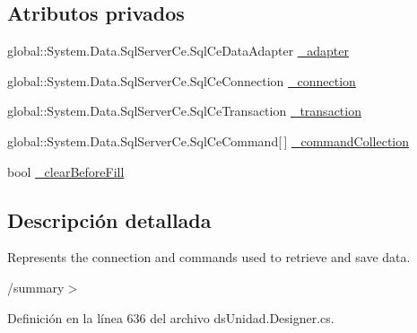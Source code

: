 \subsection*{Atributos privados}
\begin{DoxyCompactItemize}
\item 
global\-::\-System.\-Data.\-Sql\-Server\-Ce.\-Sql\-Ce\-Data\-Adapter \hyperlink{class_proyecto___integrador__3_1_1ds_unidad_table_adapters_1_1_unidad_table_adapter_ab399a596bea65cb98131fe8b2f74a979}{\-\_\-adapter}
\item 
global\-::\-System.\-Data.\-Sql\-Server\-Ce.\-Sql\-Ce\-Connection \hyperlink{class_proyecto___integrador__3_1_1ds_unidad_table_adapters_1_1_unidad_table_adapter_a1248a70b1ff6e674c43448a8a8afe9ab}{\-\_\-connection}
\item 
global\-::\-System.\-Data.\-Sql\-Server\-Ce.\-Sql\-Ce\-Transaction \hyperlink{class_proyecto___integrador__3_1_1ds_unidad_table_adapters_1_1_unidad_table_adapter_a902952d8f7e85197f0a9a3b00b0612ac}{\-\_\-transaction}
\item 
global\-::\-System.\-Data.\-Sql\-Server\-Ce.\-Sql\-Ce\-Command\mbox{[}$\,$\mbox{]} \hyperlink{class_proyecto___integrador__3_1_1ds_unidad_table_adapters_1_1_unidad_table_adapter_af19313099dd39bcd72211352e291e1fa}{\-\_\-command\-Collection}
\item 
bool \hyperlink{class_proyecto___integrador__3_1_1ds_unidad_table_adapters_1_1_unidad_table_adapter_aaffc291ca29a78e13577e8a89efa9551}{\-\_\-clear\-Before\-Fill}
\end{DoxyCompactItemize}


\subsection{Descripción detallada}
Represents the connection and commands used to retrieve and save data. 

/summary$>$ 

Definición en la línea 636 del archivo ds\-Unidad.\-Designer.\-cs.



